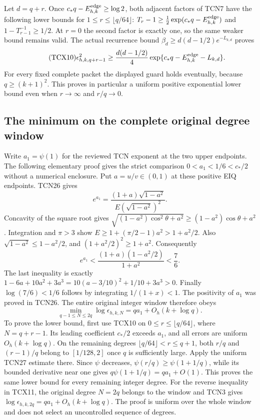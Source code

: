 \documentclass[11pt,a4paper]{article}
\begin{document}
Let $d=q+r$. Once $c_*q-E_{h,k}^{\rm edge}\ge\log2$, both
adjacent factors of TCN7 have the following lower bounds for
$1\le r\le\lfloor q/64\rfloor$:
$T_r-1\ge\tfrac12\exp(c_*q-E_{h,k}^{\rm edge})$ and
$1-T_{r-1}^{-1}\ge1/2$. At $r=0$ the second factor is exactly one,
so the same weaker bound remains valid. The actual recurrence bound
$\beta_d\ge d(d-1/2)e^{-L_{k,d}}$ proves
\begin{equation}\tag{TCX10}
 \epsilon_{h,k,q+r-1}^2\ge
 \frac{d(d-1/2)}4
 \exp\{c_*q-E_{h,k}^{\rm edge}-L_{k,d}\}.
\end{equation}
For every fixed complete packet the displayed guard holds eventually,
because $q\ge(k+1)^2$. This proves in particular a uniform positive
exponential lower bound even when $r\to\infty$ and $r/q\to0$.

\subsection{The minimum on the complete original degree window}

Write $a_1=\psi(1)$ for the reviewed TCN exponent at the two upper
endpoints. The following elementary proof gives the strict comparison
$0<a_1<1/6<c_*/2$ without a numerical enclosure. Put
$a=u/v\in(0,1)$ at these positive EIQ endpoints. TCN26 gives
\[
 e^{a_1}=\frac{(1+a)\sqrt{1-a^2}}{E(\sqrt{1-a^2})^2}.
\]
Concavity of the square root gives
$\sqrt{(1-a^2)\cos^2\theta+a^2}
\ge(1-a^2)\cos\theta+a^2$. Integration and $\pi>3$ show
$E\ge1+(\pi/2-1)a^2>1+a^2/2$. Also
$\sqrt{1-a^2}\le1-a^2/2$, and $(1+a^2/2)^2\ge1+a^2$.
Consequently
\[
 e^{a_1}<\frac{(1+a)(1-a^2/2)}{1+a^2}<\frac76.
\]
The last inequality is exactly
$1-6a+10a^2+3a^3=10(a-3/10)^2+1/10+3a^3>0$.
Finally $\log(7/6)<1/6$ follows by integrating $1/(1+x)<1$.
The positivity of $a_1$ was proved in TCN26. The entire original
integer window therefore obeys
\begin{equation}\tag{TCX11}
 \boxed{\min_{q-1\le N\le2q}\log\epsilon_{h,k,N}
             =q a_1+O_h(k+\log q).}
\end{equation}
To prove the lower bound, first use TCX10 on
$0\le r\le\lfloor q/64\rfloor$, where $N=q+r-1$.
Its leading coefficient $c_*/2$ exceeds $a_1$, and all errors are
uniform $O_h(k+\log q)$. On the remaining degrees
$\lfloor q/64\rfloor<r\le q+1$, both $r/q$ and $(r-1)/q$
belong to $[1/128,2]$ once $q$ is sufficiently large.
Apply the uniform TCN27 estimate there. Since $\psi$ decreases,
$\psi(r/q)\ge\psi(1+1/q)$, while its bounded derivative near one
gives $q\psi(1+1/q)=qa_1+O(1)$. This proves the same lower bound
for every remaining integer degree. For the reverse inequality in
TCX11, the original degree $N=2q$ belongs to the window and TCN3
gives $\log\epsilon_{h,k,2q}=qa_1+O_h(k+\log q)$.
The proof is uniform over the whole window and does not select an
uncontrolled sequence of degrees.
\end{document}

